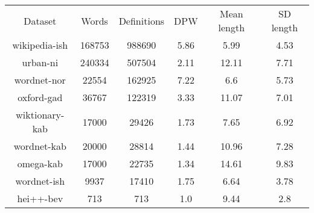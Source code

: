 \begin{tabular}{cccccc}
Dataset & Words & Definitions & DPW & Mean length & SD length\\
wikipedia-ish & 168753 & 988690 & 5.86 & 5.99 & 4.53\\
urban-ni & 240334 & 507504 & 2.11 & 12.11 & 7.71\\
wordnet-nor & 22554 & 162925 & 7.22 & 6.6 & 5.73\\
oxford-gad & 36767 & 122319 & 3.33 & 11.07 & 7.01\\
wiktionary-kab & 17000 & 29426 & 1.73 & 7.65 & 6.92\\
wordnet-kab & 20000 & 28814 & 1.44 & 10.96 & 7.28\\
omega-kab & 17000 & 22735 & 1.34 & 14.61 & 9.83\\
wordnet-ish & 9937 & 17410 & 1.75 & 6.64 & 3.78\\
hei++-bev & 713 & 713 & 1.0 & 9.44 & 2.8\\
\end{tabular}
